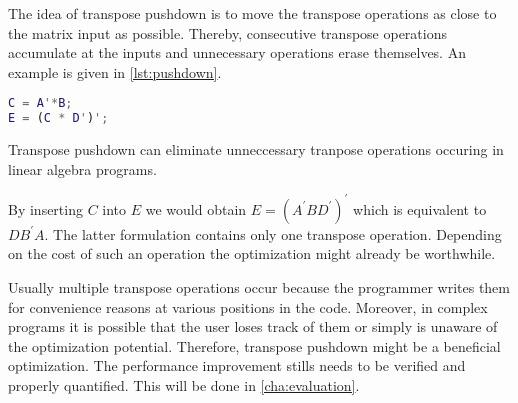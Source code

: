 The idea of transpose pushdown is to move the transpose operations as close to the matrix input as possible.
Thereby, consecutive transpose operations accumulate at the inputs and unnecessary operations erase themselves.
An example is given in \cref{lst:pushdown}.

\begin{listing}[!h]
	\begin{CenteredBox}
		\begin{lstlisting}[language=Matlab]
C = A'*B;
E = (C * D')';
		\end{lstlisting}
	\end{CenteredBox}
	\caption{Transpose pushdown can eliminate unneccessary tranpose operations occuring in linear algebra programs.}
	\label{lst:pushdown}
\end{listing}

By inserting $C$ into $E$ we would obtain $E=(A^\prime BD^\prime)^\prime$ which is equivalent to $DB^\prime A$.
The latter formulation contains only one transpose operation.
Depending on the cost of such an operation the optimization might already be worthwhile.

Usually multiple transpose operations occur because the programmer writes them for convenience reasons at various positions in the code.
Moreover, in complex programs it is possible that the user loses track of them or simply is unaware of the optimization potential.
Therefore, transpose pushdown might be a beneficial optimization.
The performance improvement stills needs to be verified and properly quantified.
This will be done in \cref{cha:evaluation}.